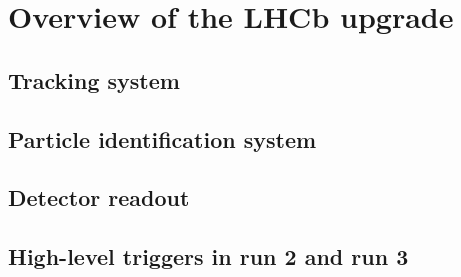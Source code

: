 \chapter{Overview of the LHCb upgrade}
\label{ref:lhcb-upgrade-overview}


\section{Tracking system}


\section{Particle identification system}


\section{Detector readout}


\section{High-level triggers in run 2 and run 3}
\label{ref:lhcb-upgrade-overview:hlt}
